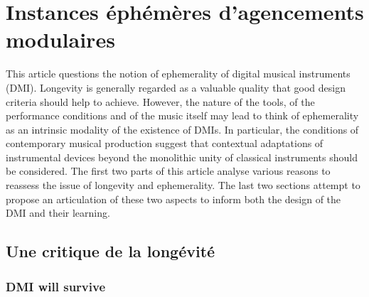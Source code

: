 %
\chapter{Instances éphémères d'agencements modulaires}
\label{ch:ephemeral}





This article questions the notion of ephemerality of digital musical instruments (DMI). Longevity is generally regarded as a valuable quality that good design criteria should help to achieve. However, the nature of the tools, of the performance conditions and of the music itself may lead to think of ephemerality as an intrinsic modality of the existence of DMIs. In particular, the conditions of contemporary musical production suggest that contextual adaptations of instrumental devices beyond the monolithic unity of classical instruments should be considered. The first two parts of this article analyse various reasons to reassess the issue of longevity and ephemerality. The last two sections attempt to propose an articulation of these two aspects to inform both the design of the DMI and their learning.

\section{Une critique de la longévité}
\label{sec:ephemerality:critique}

\subsection{DMI will survive}

